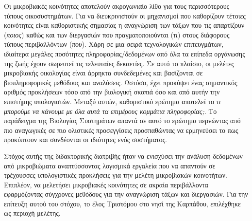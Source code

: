\documentclass[master=elt, cleveref, autoref, masteroption=eg]{kulemt}
\begin{document}
\begin{abstract*}


   Οι μικροβιακές κοινότητες αποτελούν ακρογωνιαίο λίθο για τους περισσότερους τύπους οικοσυστημάτων.
   Για να διευκρινιστούν οι μηχανισμοί που καθορίζουν τέτοιες κοινότητες είναι καθοριστικής σημασίας 
   η αναγνώριση των τάξων που τις απαρτίζουν (\textit{ποιος}) καθώς και των διεργασιών που πραγματοποιούνται (\textit{τι})
   στους διάφορους τύπους περιβαλλόντων (\textit{που}).
   Χάρη σε μια σειρά τεχνολογικών επιτευγμάτων, ιδιαίτερα μεγάλες ποσότητες πληροφορίας/δεδομένων 
   από όλα τα επίπεδα οργάνωσης της ζωής έχουν σωρευτεί τις τελευταίες δεκαετίες. 
   Σε αυτό το πλαίσιο, οι μελέτες μικροβιακής οικολογίας είναι άρρηκτα συνδεδεμένες και βασίζονται σε βιοπληροφορικές μεθόδους και αναλύσεις. 
   Ωστόσο, έχει προκύψει ένας σημαντικός αριθμός προκλήσεων τόσο από την βιολογική σκοπιά όσο και από αυτήν την επιστήμης υπολογιστών.
   Μεταξύ αυτών, καθοριστικό ερώτημα αποτελεί το \textit{τι μπορούμε να κάνουμε με όλα αυτά τα επιμέρους κομμάτια πληροφορίας;}.
   Το παράδειγμα της Βιολογίας Συστημάτων απαντά σε αυτό το ερώτημα περνώντας από πιο αναγωγικές σε πιο ολιστικές προσεγγίσεις
   προσπαθώντας να ερμηνεύσει το πως προκύπτουν και συνδέονται οι ιδιότητες ενός συστήματος. 

   Στόχος αυτής της διδακτορικής διατριβής ήταν να ενισχύσει την ανάλυση δεδομένων από μικροβιώματα 
   αναπτύσσοντας λογισμικά εργαλεία που να απαντούν σε τρέχουσσες υπολογιστικές προκλήσεις για την 
   μελέτη μικροβιακών κοινοτήτων. 
   Επιπλέον, να μελετήσει μικροβιακές κοινότητες σε ακραία περιβάλλοντα εφαρμόζοντας σύγχρονες μεθόδους 
   για την αναγνώριση τάξων και διεργασιών. 
   Για την επίτευξη αυτού του στόχου, το έλος Τριστόμου στο νησί της Καρπάθου, επιλέχθηκε ως περιοχή μελέτης.


\end{abstract*}
\end{document}
